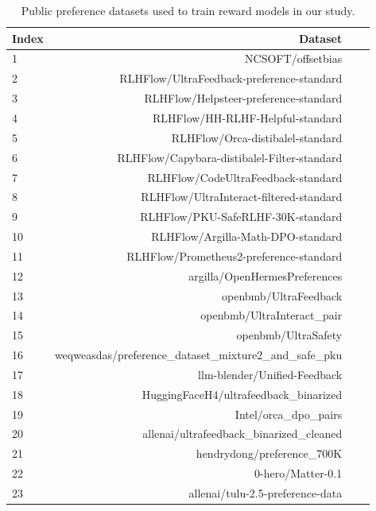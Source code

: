 \begin{table*}[]
\small
\begin{center}
\begin{tabular}{lrrr}
\toprule
\textbf{Index} & \textbf{Dataset} \\
\midrule
1 & NCSOFT/offsetbias \cite {park2024offsetbias} \\
2 & RLHFlow/UltraFeedback-preference-standard \cite{dong2024rlhf} \\
3 & RLHFlow/Helpsteer-preference-standard \cite{dong2024rlhf} \\
4 & RLHFlow/HH-RLHF-Helpful-standard \cite{dong2024rlhf} \\
5 & RLHFlow/Orca-distibalel-standard \cite{dong2024rlhf} \\
6 & RLHFlow/Capybara-distibalel-Filter-standard \cite{dong2024rlhf} \\
7 & RLHFlow/CodeUltraFeedback-standard \cite{dong2024rlhf} \\
8 & RLHFlow/UltraInteract-filtered-standard \cite{dong2024rlhf} \\
9 & RLHFlow/PKU-SafeRLHF-30K-standard \cite{dong2024rlhf} \\
10 & RLHFlow/Argilla-Math-DPO-standard \cite{dong2024rlhf} \\
11 & RLHFlow/Prometheus2-preference-standard \cite{kim2023prometheus, kim2024prometheus} \\
12 & argilla/OpenHermesPreferences \cite{open_hermes_preferences} \\
13 & openbmb/UltraFeedback \cite{cui2023ultrafeedback} \\
14 & openbmb/UltraInteract\_pair \cite{yuan2024advancing} \\
15 & openbmb/UltraSafety \cite{guo2024controllable} \\
16 & weqweasdas/preference\_dataset\_mixture2\_and\_safe\_pku \cite{dong2023raft, xiong2023gibbs}
\\
17 & llm-blender/Unified-Feedback \cite{jiang2023llm} \\
18 & HuggingFaceH4/ultrafeedback\_binarized \cite{tunstall2023zephyr} \\
19 & Intel/orca\_dpo\_pairs \cite{OpenOrca} \\
20 & allenai/ultrafeedback\_binarized\_cleaned \cite{tunstall2023zephyr} \\
21 & hendrydong/preference\_700K \cite{dong2024rlhf} \\
22 & 0-hero/Matter-0.1 \cite{lambert_rewardbench_2024} \\
23 & allenai/tulu-2.5-preference-data \cite{ivison2024unpacking} \\
\bottomrule
\end{tabular}
\caption{Public preference datasets used to train reward models in our study.}
\label{tab:training-datasets}
\end{center}
\end{table*}


